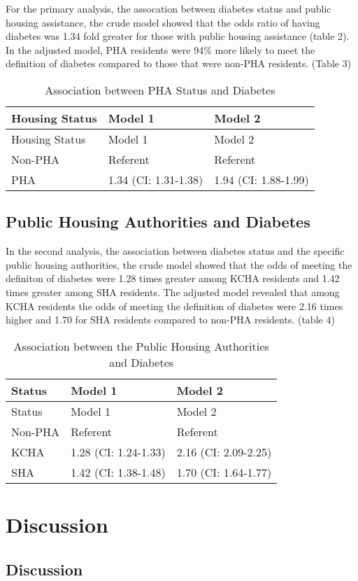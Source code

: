 \documentclass [11pt, proquest] {uwthesis}[2015/03/03]
\begin{document}
For the primary analysis, the assocation between diabetes status and
public housing assistance, the crude model showed that the odds ratio of
having diabetes was 1.34 fold greater for those with public housing
assistance (table 2). In the adjusted model, PHA residents were 94\%
more likely to meet the definition of diabetes compared to those that
were non-PHA residents. (Table 3)
\begin{longtable}[]{@{}lll@{}}
\caption{\label{tab:inher} Association between PHA Status and
Diabetes}\tabularnewline
\toprule
Housing Status & Model 1 & Model 2\tabularnewline
\midrule
\endfirsthead
\toprule
Housing Status & Model 1 & Model 2\tabularnewline
\midrule
\endhead
Non-PHA & Referent & Referent\tabularnewline
PHA & 1.34 (CI: 1.31-1.38) & 1.94 (CI: 1.88-1.99)\tabularnewline
\bottomrule
\end{longtable}
\section{Public Housing Authorities and
Diabetes}\label{public-housing-authorities-and-diabetes}

In the second analysis, the association between diabetes status and the
specific public housing authorities, the crude model showed that the
odds of meeting the definiton of diabetes were 1.28 times greater among
KCHA residents and 1.42 times greater among SHA residents. The adjusted
model revealed that among KCHA residents the odds of meeting the
definition of diabetes were 2.16 times higher and 1.70 for SHA residents
compared to non-PHA residents. (table 4)
\begin{longtable}[]{@{}lll@{}}
\caption{\label{tab:inher} Association between the Public Housing
Authorities and Diabetes}\tabularnewline
\toprule
Status & Model 1 & Model 2\tabularnewline
\midrule
\endfirsthead
\toprule
Status & Model 1 & Model 2\tabularnewline
\midrule
\endhead
Non-PHA & Referent & Referent\tabularnewline
KCHA & 1.28 (CI: 1.24-1.33) & 2.16 (CI: 2.09-2.25)\tabularnewline
SHA & 1.42 (CI: 1.38-1.48) & 1.70 (CI: 1.64-1.77)\tabularnewline
\bottomrule
\end{longtable}
\chapter{Discussion}\label{discussion}

\section{Discussion}\label{discussion-1}
\end{document}

